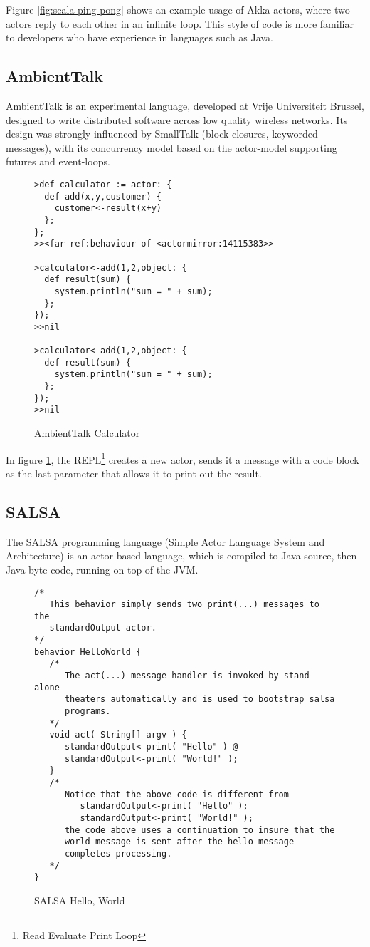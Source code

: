 \documentclass{article}
\begin{document}
Figure \ref{fig:scala-ping-pong} shows an example usage of Akka actors, where two actors
reply to each other in an infinite loop. This style of code is more familiar to 
developers who have experience in languages such as Java.

\subsection{AmbientTalk}

AmbientTalk is an experimental language, developed at Vrije Universiteit Brussel, designed to
write distributed software across low quality wireless networks. Its design was strongly
influenced by SmallTalk (block closures, keyworded messages), with its concurrency model
based on the actor-model supporting futures and event-loops.

\begin{figure}[H]
\begin{verbatim}
>def calculator := actor: {
  def add(x,y,customer) {
    customer<-result(x+y)
  };
};
>><far ref:behaviour of <actormirror:14115383>>

>calculator<-add(1,2,object: {
  def result(sum) {
    system.println("sum = " + sum);
  };
});
>>nil

>calculator<-add(1,2,object: {
  def result(sum) {
    system.println("sum = " + sum);
  };
});
>>nil
\end{verbatim}
\caption{AmbientTalk Calculator}
\label{fig:ambienttalk-calc}
\end{figure}

In figure \ref{fig:ambienttalk-calc}, the REPL\footnote{Read Evaluate Print Loop} creates a
new actor, sends it a message with a code block as the last parameter that allows it to
print out the result.

\subsection{SALSA}

The SALSA programming language (Simple Actor Language System and Architecture) is
an actor-based language, which is compiled to Java source, then Java byte code, running
on top of the JVM.

\begin{figure}[H]
\begin{verbatim}
/*
   This behavior simply sends two print(...) messages to the 
   standardOutput actor.
*/
behavior HelloWorld {
   /*
      The act(...) message handler is invoked by stand-alone
      theaters automatically and is used to bootstrap salsa
      programs.
   */
   void act( String[] argv ) {
      standardOutput<-print( "Hello" ) @
      standardOutput<-print( "World!" );
   }
   /*
      Notice that the above code is different from 
         standardOutput<-print( "Hello" );
         standardOutput<-print( "World!" );
      the code above uses a continuation to insure that the 
      world message is sent after the hello message 
      completes processing.
   */
}
\end{verbatim}
\caption{SALSA Hello, World}
\label{fig:salsa-helloworld}
\end{figure}
\end{document}
